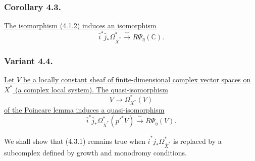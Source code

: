 \subsubsection*{Corollary 4.3.}
\underline{The isomorphism (4.1.2) induces an isomorphism}
\begin{equation}\tag{4.3.1}
\bar i^*\bar j_*\Omega_{\bar X^*}^*
\xrightarrow{\ \sim\ }R\Psi_\eta(\mathbb C).
\end{equation}

\subsubsection*{Variant 4.4.}
\underline{Let $V$ be a locally constant sheaf of finite-dimensional
complex vector spaces on $X^*$ (a complex local system).  The
quasi-isomorphism}
\[
V\longrightarrow\Omega_{X^*}^*(V)
\]
\underline{of the Poincare lemma induces a quasi-isomorphism}
\begin{equation}\tag{4.4.1}
\bar i^*\bar j_*\Omega_{\bar X^*}^*(p'^*V)
\xrightarrow{\ \sim\ }R\Psi_\eta(V).
\end{equation}

We shall show that (4.3.1) remains true when
$\bar i^*\bar j_*\Omega_{\bar X^*}^*$ is replaced by a subcomplex
defined by growth and monodromy conditions.
